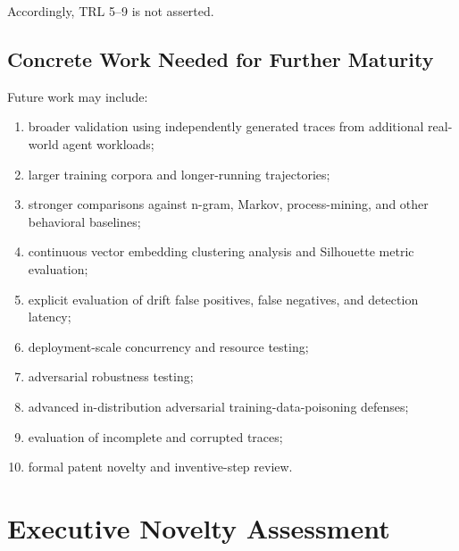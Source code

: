 \documentclass[11pt,a4paper]{article}
\begin{document}
Accordingly, TRL 5--9 is not asserted.

\subsection*{Concrete Work Needed for Further Maturity}

Future work may include:

\begin{enumerate}[leftmargin=1.6em]

\item broader validation using independently generated traces from additional real-world
agent workloads;

\item larger training corpora and longer-running trajectories;

\item stronger comparisons against n-gram, Markov, process-mining, and other behavioral
baselines;

\item continuous vector embedding clustering analysis and Silhouette metric evaluation;

\item explicit evaluation of drift false positives, false negatives, and detection
latency;

\item deployment-scale concurrency and resource testing;

\item adversarial robustness testing;

\item advanced in-distribution adversarial training-data-poisoning defenses;

\item evaluation of incomplete and corrupted traces;

\item formal patent novelty and inventive-step review.

\end{enumerate}

\section*{Executive Novelty Assessment}
\end{document}
